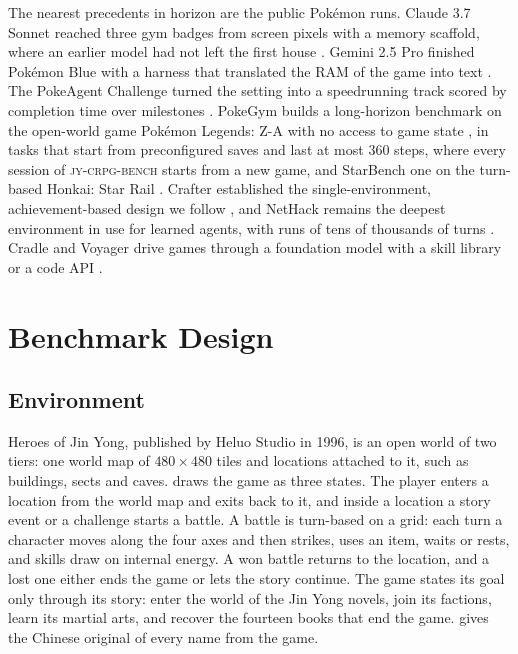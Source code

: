 \documentclass{article} %
\newcommand{\bench}{\textsc{jy-crpg-bench}}
\begin{document}
The nearest precedents in horizon are the public Pok\'emon runs. Claude 3.7 Sonnet reached three
gym badges from screen pixels with a memory scaffold, where an earlier
model had not left the first house \citep{anthropic2025pokemon}. Gemini 2.5
Pro finished Pok\'emon Blue with a harness that translated the
RAM of the game into text \citep{comanici2025gemini}. The PokeAgent Challenge turned the setting
into a speedrunning track scored by completion time over milestones
\citep{karten2026pokeagent}. PokeGym builds a long-horizon benchmark on the
open-world game Pok\'emon Legends: Z-A with no access to game state
\citep{zhang2026pokegym}, in tasks that start from preconfigured saves and
last at most 360 steps, where every session of \bench{} starts from a new
game, and StarBench one on the turn-based Honkai: Star
Rail \citep{zhang2025starbench}. Crafter established the single-environment,
achievement-based design we follow \citep{hafner2021benchmarking}, and
NetHack remains the deepest environment in use for learned agents, with runs of tens of thousands of turns \citep{kuttler2020nethack}. Cradle and Voyager drive games through a foundation model with a skill library or a code API \citep{tan2024cradle,wang2023voyager}.

\section{Benchmark Design}
\label{sec:bench}

\subsection{Environment}
\label{sec:env}

Heroes of Jin Yong, published by Heluo Studio in 1996, is an open world of two tiers: one world map of $480\times480$ tiles \citep{scarsty2026kyscpp} and \Mscenes{} locations attached to it, such as buildings, sects and caves.  draws the game as three states. The player enters a location from the world map and exits back to it, and inside a location a story event or a challenge starts a battle. A battle is turn-based on a grid: each turn a character moves along the four axes and then strikes, uses an item, waits or rests, and skills draw on internal energy. A won battle returns to the location, and a lost one either ends the game or lets the story continue. The game states its goal only through its story: enter the world of the Jin Yong novels, join its factions, learn its martial arts, and recover the fourteen books that end the game.  gives the Chinese original of every name from the game.
\end{document}
